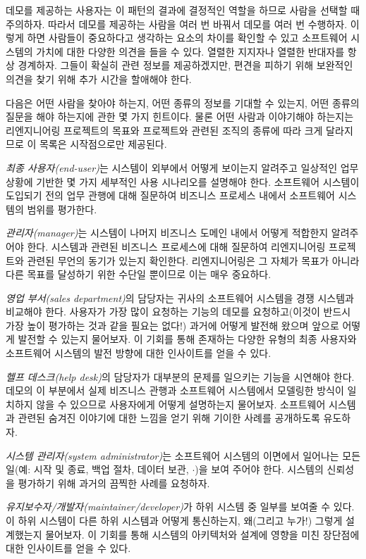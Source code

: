 \documentclass[a4paper,10pt,twoside]{book}
\begin{document}
데모를 제공하는 사용자는 이 패턴의 결과에 결정적인 역할을 하므로 사람을 선택할 때 주의하자. 따라서 데모를 제공하는 사람을 여러 번 바꿔서 데모를 여러 번 수행하자. 이렇게 하면 사람들이 중요하다고 생각하는 요소의 차이를 확인할 수 있고 소프트웨어 시스템의 가치에 대한 다양한 의견을 들을 수 있다. 열렬한 지지자나 열렬한 반대자를 항상 경계하자. 그들이 확실히 관련 정보를 제공하겠지만, 편견을 피하기 위해 보완적인 의견을 찾기 위해 추가 시간을 할애해야 한다. 

다음은 어떤 사람을 찾아야 하는지, 어떤 종류의 정보를 기대할 수 있는지, 어떤 종류의 질문을 해야 하는지에 관한 몇 가지 힌트이다. 물론 어떤 사람과 이야기해야 하는지는 리엔지니어링 프로젝트의 목표와 프로젝트와 관련된 조직의 종류에 따라 크게 달라지므로 이 목록은 시작점으로만 제공된다.

\begin{bulletlist}
  \item \emph{최종 사용자(end-user)}는 시스템이 외부에서 어떻게 보이는지 알려주고 일상적인 업무 상황에 기반한 몇 가지 세부적인 사용 시나리오를 설명해야 한다. 소프트웨어 시스템이 도입되기 전의 업무 관행에 대해 질문하여 비즈니스 프로세스 내에서 소프트웨어 시스템의 범위를 평가한다.

  \item \emph{관리자(manager)}는 시스템이 나머지 비즈니스 도메인 내에서 어떻게 적합한지 알려주어야 한다. 시스템과 관련된 비즈니스 프로세스에 대해 질문하여 리엔지니어링 프로젝트와 관련된 무언의 동기가 있는지 확인한다. 리엔지니어링은 그 자체가 목표가 아니라 다른 목표를 달성하기 위한 수단일 뿐이므로 이는 매우 중요하다.

  \item \emph{영업 부서(sales department)}의 담당자는 귀사의 소프트웨어 시스템을 경쟁 시스템과 비교해야 한다. 사용자가 가장 많이 요청하는 기능의 데모를 요청하고(이것이 반드시 가장 높이 평가하는 것과 같을 필요는 없다!) 과거에 어떻게 발전해 왔으며 앞으로 어떻게 발전할 수 있는지 물어보자. 이 기회를 통해 존재하는 다양한 유형의 최종 사용자와 소프트웨어 시스템의 발전 방향에 대한 인사이트를 얻을 수 있다.

  \item \emph{헬프 데스크(help desk)}의 담당자가 대부분의 문제를 일으키는 기능을 시연해야 한다. 데모의 이 부분에서 실제 비즈니스 관행과 소프트웨어 시스템에서 모델링한 방식이 일치하지 않을 수 있으므로 사용자에게 어떻게 설명하는지 물어보자. 소프트웨어 시스템과 관련된 숨겨진 이야기에 대한 느낌을 얻기 위해 기이한 사례를 공개하도록 유도하자.

  \item \emph{시스템 관리자(system administrator)}는 소프트웨어 시스템의 이면에서 일어나는 모든 일(예: 시작 및 종료, 백업 절차, 데이터 보관, $\cdot$)을 보여 주어야 한다. 시스템의 신뢰성을 평가하기 위해 과거의 끔찍한 사례를 요청하자.

  \item \emph{유지보수자/개발자(maintainer/developer)}가 하위 시스템 중 일부를 보여줄 수 있다. 이 하위 시스템이 다른 하위 시스템과 어떻게 통신하는지, 왜(그리고 누가!) 그렇게 설계했는지 물어보자. 이 기회를 통해 시스템의 아키텍처와 설계에 영향을 미친 장단점에 대한 인사이트를 얻을 수 있다.
\end{bulletlist}
\end{document}
